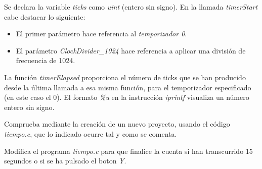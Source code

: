 Se declara la variable \textit{ticks} como \textit{uint} (entero sin signo). En la llamada \textit{timerStart} cabe destacar lo si\-guien\-te:
\begin{itemize}
\item El primer parámetro hace referencia al \textit{temporizador 0}.
%
\item El parámetro \textit{ClockDivider\_1024} hace referencia a aplicar una división de frecuencia de 1024.
\end{itemize}

La función \textit{timerElapsed} proporciona el número de ticks que se han producido desde la última llamada a esa misma función, para el temporizador especificado (en este caso el 0).  El formato \textit{\%u} en la instrucción \textit{iprintf}  visualiza un número entero sin signo.

\begin{exercise}
	Comprueba mediante la creación de un nuevo proyecto, usando el código \textit{tiempo.c}, que lo indicado ocurre tal y como se comenta.
\end{exercise}

\begin{exercise}
Modifica el programa \textit{tiempo.c} para que finalice la cuenta si han transcurrido 15 segundos o si se ha pulsado el boton \textit{Y}.
\end{exercise}


